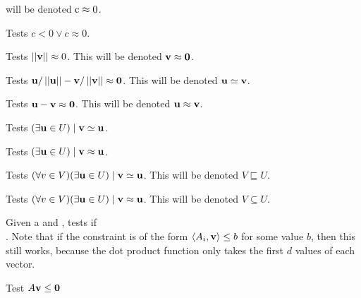  will be denoted $\mli{c} \approx 0$.
\lstapproximatelyzeroa

Tests $c < 0 \lor c \approx 0$.
\lstapproximatelyltzero

Tests $\left|\left|\mathbf{v}\right|\right| \approx 0$.  This will be denoted $\mathbf{v} \approx \mathbf{0}$.
\lstapproximatelyzerob

Tests $\mathbf{u}/\left|\left|\mathbf{u}\right|\right| - \mathbf{v}/\left|\left|\mathbf{v}\right|\right| \approx \mathbf{0} $.  This will be denoted $\mathbf{u} \simeq \mathbf{v}$.
\lstisequivalent

Tests $\mathbf{u} - \mathbf{v} \approx \mathbf{0}$.  This will be denoted $\mathbf{u} \approx \mathbf{v}$.
\lstisequal

Tests $(\exists \mathbf{u} \in U) \;|\; \mathbf{v} \simeq \mathbf{u}$.
\lsthasequivalentmember

Tests $(\exists \mathbf{u} \in U) \;|\; \mathbf{v} \approx \mathbf{u}$.
\lsthasequalmember

Tests $(\forall v \in V)(\exists \mathbf{u} \in U) \;|\; \mathbf{v} \simeq \mathbf{u}$.  This will be denoted $V \sqsubseteq U$.
\lstsubsetmodeq

Tests $(\forall v \in V)(\exists \mathbf{u} \in U) \;|\; \mathbf{v} \approx \mathbf{u}$.  This will be denoted $V \subseteq U$.
\lstsubset

Given a  and , tests if \\
.  Note that if the constraint is of the form $\left\langle A_i, \mathbf{v} \right\rangle \leq b$ for some value $b$, then this still works, because the dot product function only takes the first $d$ values of each vector.
\lstraysatisfieda

Test $A\mathbf{v} \leq \mathbf{0}$
\lstraysatisfiedb


